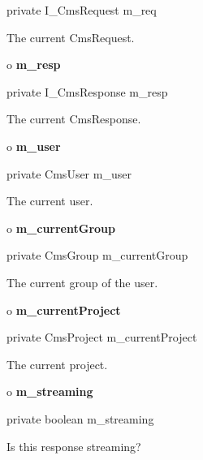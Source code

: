 \begin{PRE}
 private I\_CmsRequest m\_req
\end{PRE}

\begin{description}
\htmlDD The current CmsRequest.

\end{description}

o {\bf m\_resp} 

\begin{PRE}
 private I\_CmsResponse m\_resp
\end{PRE}

\begin{description}
\htmlDD The current CmsResponse.

\end{description}

o {\bf m\_user} 

\begin{PRE}
 private CmsUser m\_user
\end{PRE}

\begin{description}
\htmlDD The current user.

\end{description}

o {\bf m\_currentGroup} 

\begin{PRE}
 private CmsGroup m\_currentGroup
\end{PRE}

\begin{description}
\htmlDD The current group of the user.

\end{description}

o {\bf m\_currentProject} 

\begin{PRE}
 private CmsProject m\_currentProject
\end{PRE}

\begin{description}
\htmlDD The current project.

\end{description}

o {\bf m\_streaming} 

\begin{PRE}
 private boolean m\_streaming
\end{PRE}

\begin{description}
\htmlDD Is this response streaming?

\end{description}

